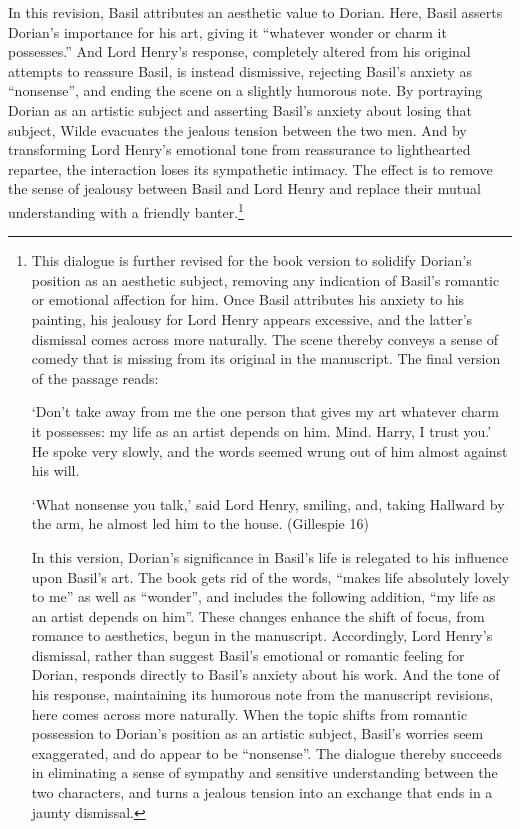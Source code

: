\documentclass[11pt]{article}
\begin{document}
In this revision, Basil attributes an aesthetic value to Dorian. Here,
Basil asserts Dorian’s importance for his art, giving it “whatever
wonder or charm it possesses.” And Lord Henry’s response, completely
altered from his original attempts to reassure Basil, is instead
dismissive, rejecting Basil’s anxiety as “nonsense”, and ending the
scene on a slightly humorous note. By portraying Dorian as an artistic
subject and asserting Basil’s anxiety about losing that subject, Wilde
evacuates the jealous tension between the two men. And by transforming
Lord Henry’s emotional tone from reassurance to lighthearted repartee,
the interaction loses its sympathetic intimacy. The effect is to
remove the sense of jealousy between Basil and Lord Henry and replace
their mutual understanding with a friendly banter.\footnote{This dialogue is further revised for the book version to solidify
Dorian’s position as an aesthetic subject, removing any indication of
Basil’s romantic or emotional affection for him. Once Basil attributes
his anxiety to his painting, his jealousy for Lord Henry appears
excessive, and the latter’s dismissal comes across more naturally. The
scene thereby conveys a sense of comedy that is missing from its
original in the manuscript. The final version of the passage reads:

‘Don’t take away from me the one person that gives my art whatever
charm it possesses: my life as an artist depends on him. Mind. Harry,
I trust you.’ He spoke very slowly, and the words seemed wrung out of
him almost against his will.

‘What nonsense you talk,’ said Lord Henry, smiling, and, taking
Hallward by the arm, he almost led him to the house. (Gillespie 16)

In this version, Dorian’s significance in Basil’s life is relegated to
his influence upon Basil’s art. The book gets rid of the words, “makes
life absolutely lovely to me” as well as “wonder”, and includes the
following addition, “my life as an artist depends on him”. These
changes enhance the shift of focus, from romance to aesthetics, begun
in the manuscript. Accordingly, Lord Henry’s dismissal, rather than
suggest Basil’s emotional or romantic feeling for Dorian, responds
directly to Basil’s anxiety about his work. And the tone of his
response, maintaining its humorous note from the manuscript revisions,
here comes across more naturally. When the topic shifts from romantic
possession to Dorian’s position as an artistic subject, Basil’s
worries seem exaggerated, and do appear to be “nonsense”. The dialogue
thereby succeeds in eliminating a sense of sympathy and sensitive
understanding between the two characters, and turns a jealous tension
into an exchange that ends in a jaunty dismissal.}
\end{document}
